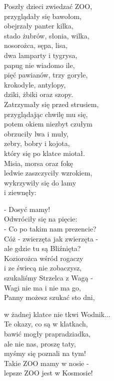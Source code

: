 \documentclass[11pt,a4pape,leqno,twoside]{book}
\begin{document}
Poszły dzieci zwiedzać ZOO,\\
przyglądały się bawołom,\\
obejrzały panter kilka,\\
stado żubrów, słonia, wilka,\\
nosorożca, sępa, lisa,\\
dwa lamparty i tygrysa,\\
papug nie wiadomo ile,\\
pięć pawianów, trzy goryle,\\
krokodyle, antylopy,\\
dziki, żbiki oraz szopy.\\
Zatrzymały się przed strusiem,\\
przyglądając chwilę mu się,\\
potem okiem niezbyt czułym\\
obrzuciły lwa i muły,\\
zebry, bobry i kojota,\\
który się po klatce miotał.\\
Misia, morsa oraz fokę\\
ledwie zaszczyciły wzrokiem,\\
wykrzywiły się do lamy\\
i ziewnęły:\\ \vspace{0.1cm}

- Dosyć mamy!\\
Odwróciły się na pięcie:\\
- Co po takim nam prezencie?\\
Cóż - zwierzęta jak zwierzęta -\\
ale gdzie tu są Bliźnięta?\\
Koziorożca wśród rogaczy\\
i ze świecą nie zobaczysz,\\
szukaliśmy Strzelca z Wagą -\\
Wagi nie ma i nie ma go,\\
Panny możesz szukać sto dni,\\ \vspace{0.1cm}

w żadnej klatce nie tkwi Wodnik...\\
Te okazy, co są w klatkach,\\
bawić mogły prapradziadka,\\
ale nie nas, proszę taty,\\
myśmy się poznali na tym!\\
Takie ZOO mamy w nosie -\\
lepsze ZOO jest w Kosmosie!\\ \vspace{0.1cm}
\end{document}
